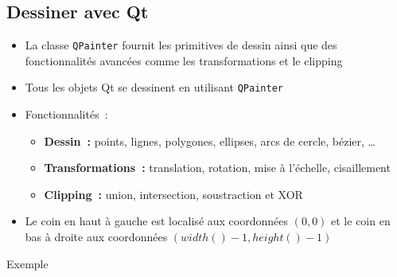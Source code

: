 \documentclass{beamer} %
\begin{document}
\subsection{Dessiner avec Qt}
\begin{frame}
	\begin{itemize}
	\item La classe \texttt{QPainter} fournit les primitives de dessin ainsi que des fonctionnalités avancées comme les transformations et le clipping
	\item<2-> Tous les objets Qt se dessinent en utilisant \texttt{QPainter}
	\item<3-> Fonctionnalités~:
		\begin{itemize}
		\item<4-> \textbf{Dessin~:} points, lignes, polygones, ellipses, arcs de cercle, bézier, \ldots
		\item<5-> \textbf{Transformations~:} translation, rotation, mise à l'échelle, cisaillement
		\item<6-> \textbf{Clipping~:} union, intersection, soustraction et XOR
		\end{itemize}
	\item<7-> Le coin en haut à gauche est localisé aux coordonnées $(0,0)$ et le coin en bas à droite aux coordonnées $(width() - 1, height() - 1)$
	\end{itemize}
\end{frame}

\begin{frame}
\begin{exampleblock}{Exemple}
	
\end{exampleblock}

\begin{center}
\vspace{1.3cm}	
\hspace{1cm}
\end{center}

\end{frame}
\end{document}
